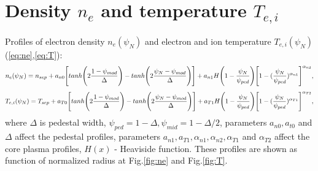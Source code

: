 \documentclass[11pt,oneside,a4paper,notitlepage]{article}
\begin{document}
\section{Density $n_e$ and temperature $T_{e,i}$}
Profiles of electron density $n_e(\psi_N)$ and electron and ion temperature $T_{e,i}(\psi_N)$ 
(\ref{eq:ne},\ref{eq:T}):
\begin{equation}\label{eq:ne}
 n_e(\psi_N)=n_{sep}+a_{n0}\Bigg[tanh\Bigg(2\frac{1-\psi_{mod}}{\Delta}\Bigg)-\\
 tanh\Bigg(2\frac{\psi_N-\psi_{mod}}{\Delta}\Bigg)\Bigg] \\
 +a_{n1}H\Bigg(1-\frac{\psi_N}{\psi_{ped}}\Bigg)\Bigg[1-\\
 (\frac{\psi_N}{\psi_{ped}})^{\alpha_{n1}}\Bigg]^{\alpha_{n2}},
\end{equation}
\begin{equation}\label{eq:T}
 T_{e,i}(\psi_N)=T_{sep}+a_{T0}\Bigg[tanh\Bigg(2\frac{1-\psi_{mod}}{\Delta}\Bigg)-\\
 tanh\Bigg(2\frac{\psi_N-\psi_{mod}}{\Delta}\Bigg)\Bigg] \\
 +a_{T1}H\Bigg(1-\frac{\psi_N}{\psi_{ped}}\Bigg)\Bigg[1-\\
 (\frac{\psi_N}{\psi_{ped}})^{\alpha_{T1}}\Bigg]^{\alpha_{T2}},
\end{equation}
where $\Delta$ is pedestal width, $\psi_{ped}=1-\Delta,\psi_{mid}=1-\Delta/2$, 
parameters $a_{n0},a_{t0}$ and $\Delta$ affect the pedestal profiles, 
parameters $a_{n1},a_{T1},\alpha_{n1},\alpha_{n2},\alpha_{T1}$ and $\alpha_{T2}$ affect the 
core plasma profiles, $H(x)$ - Heaviside function. These profiles are shown as function of 
normalized radius at Fig.\ref{fig:ne} and Fig.\ref{fig:T}.
\end{document}
